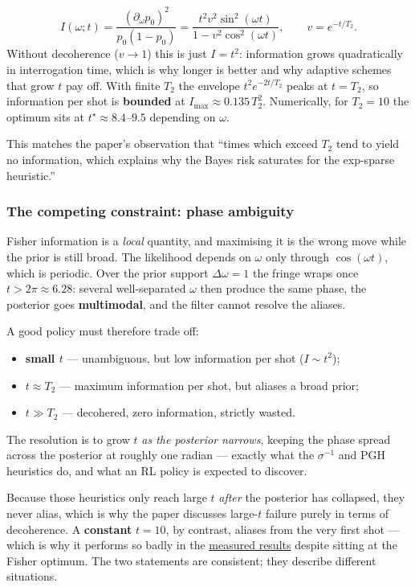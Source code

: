 \documentclass[12pt,a4paper]{article}
\begin{document}
\begin{equation}
I(\omega; t) = \frac{(\partial_\omega p_0)^{2}}{p_0(1-p_0)}
             = \frac{t^{2} v^{2} \sin^{2}(\omega t)}{1 - v^{2}\cos^{2}(\omega t)},
\qquad v = e^{-t/T_2}.
\label{eq:fisher}
\end{equation}
Without decoherence ($v \to 1$) this is just $I = t^2$: information grows quadratically in interrogation time, which is why longer is better and why adaptive schemes that grow $t$ pay off. With finite $T_2$ the envelope $t^2 e^{-2t/T_2}$ peaks at $t = T_2$, so information per shot is \textbf{bounded} at $I_{\max} \approx 0.135\,T_2^2$. Numerically, for $T_2 = 10$ the optimum sits at $t^\star \approx 8.4$--$9.5$ depending on $\omega$.

This matches the paper's observation that ``times which exceed $T_2$ tend to yield no information, which explains why the Bayes risk saturates for the exp-sparse heuristic.''

\subsubsection{The competing constraint: phase ambiguity}\label{sec:the-competing-constraint-phase-ambiguity}
Fisher information is a \emph{local} quantity, and maximising it is the wrong move while the prior is still broad. The likelihood depends on $\omega$ only through $\cos(\omega t)$, which is periodic. Over the prior support $\Delta\omega = 1$ the fringe wraps once $t > 2\pi \approx 6.28$: several well-separated $\omega$ then produce the same phase, the posterior goes \textbf{multimodal}, and the filter cannot resolve the aliases.

A good policy must therefore trade off:

\begin{itemize}
  \item \textbf{small $t$} --- unambiguous, but low information per shot ($I \sim t^2$);
  \item \textbf{$t \approx T_2$} --- maximum information per shot, but aliases a broad prior;
  \item \textbf{$t \gg T_2$} --- decohered, zero information, strictly wasted.
\end{itemize}
The resolution is to grow $t$ \emph{as the posterior narrows}, keeping the phase spread across the posterior at roughly one radian --- exactly what the $\sigma^{-1}$ and PGH heuristics do, and what an RL policy is expected to discover.

Because those heuristics only reach large $t$ \emph{after} the posterior has collapsed, they never alias, which is why the paper discusses large-$t$ failure purely in terms of decoherence. A \textbf{constant} $t = 10$, by contrast, aliases from the very first shot --- which is why it performs so badly in the \hyperref[sec:baseline-results]{measured results} despite sitting at the Fisher optimum. The two statements are consistent; they describe different situations.
\end{document}
